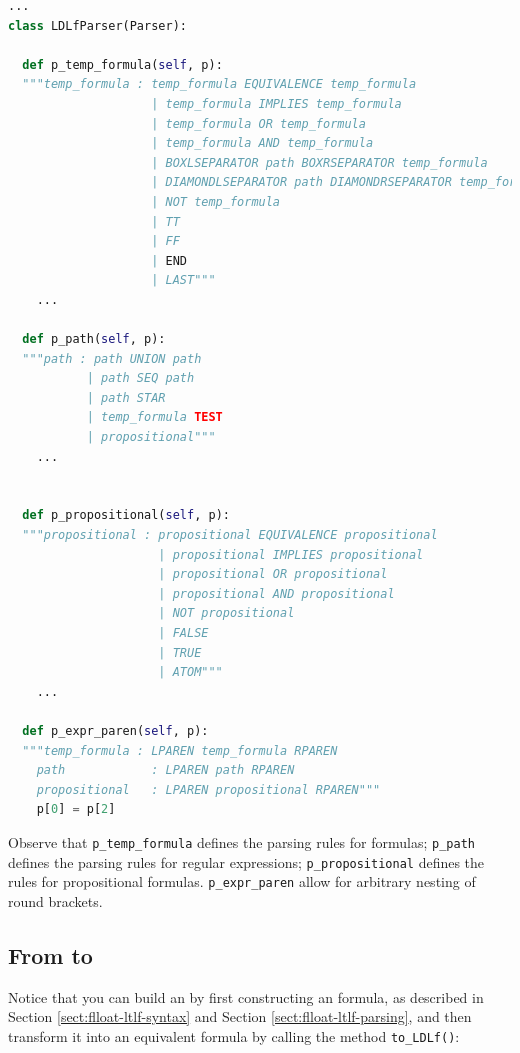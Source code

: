 \begin{lstlisting}[language=Python, style=Python, escapechar = £,  label={code:ldlf-parsing-rules}, caption={Parsing rules for \LDLf (excerpts from \href{https://github.com/MarcoFavorito/flloat/blob/0.1.4/flloat/parser/ldlf.py}{flloat/parser/ldlf.py})}]
...
class LDLfParser(Parser):

  def p_temp_formula(self, p):
  """temp_formula : temp_formula EQUIVALENCE temp_formula
                    | temp_formula IMPLIES temp_formula
                    | temp_formula OR temp_formula
                    | temp_formula AND temp_formula
                    | BOXLSEPARATOR path BOXRSEPARATOR temp_formula
                    | DIAMONDLSEPARATOR path DIAMONDRSEPARATOR temp_formula
                    | NOT temp_formula
                    | TT
                    | FF
                    | END
                    | LAST"""
    ...
  
  def p_path(self, p):
  """path : path UNION path
           | path SEQ path
           | path STAR
           | temp_formula TEST
           | propositional"""
    ...


  def p_propositional(self, p):
  """propositional : propositional EQUIVALENCE propositional
                     | propositional IMPLIES propositional
                     | propositional OR propositional
                     | propositional AND propositional
                     | NOT propositional
                     | FALSE
                     | TRUE
                     | ATOM"""
    ...

  def p_expr_paren(self, p):
  """temp_formula : LPAREN temp_formula RPAREN
    path            : LPAREN path RPAREN
    propositional   : LPAREN propositional RPAREN"""
    p[0] = p[2]
\end{lstlisting}
Observe that \texttt{p\_temp\_formula} defines the parsing rules for \LDLf formulas; \texttt{p\_path} defines the parsing rules for regular expressions; \texttt{p\_propositional} defines the rules for propositional formulas. \texttt{p\_expr\_paren} allow for arbitrary nesting of round brackets.

\subsection{From \LTLf to \LDLf}
Notice that you can build an \LDLf by first constructing an \LTLf formula, as described in Section \ref{sect:flloat-ltlf-syntax} and Section \ref{sect:flloat-ltlf-parsing}, and then transform it into an equivalent \LDLf formula by calling the method \texttt{to\_LDLf()}:

